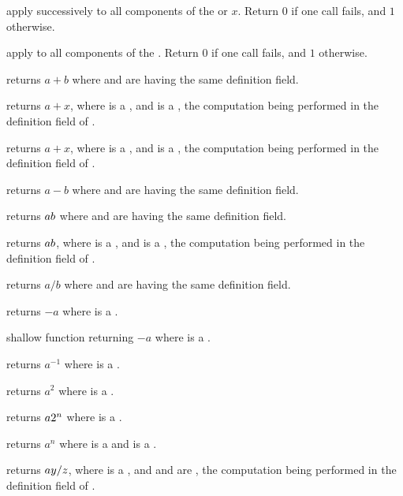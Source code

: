  apply  successively to all
components of the  or  $x$. Return $0$ if one call fails,
and $1$ otherwise.

 apply  to all components
of the . Return $0$ if one call fails, and $1$ otherwise.

 returns $a+b$ where  and  are
 having the same definition field.

 returns $a+x$, where  is a
, and  is a , the computation being
performed in the definition field of .

 returns $a+x$, where  is a
, and  is a , the computation being
performed in the definition field of .

 returns $a-b$ where  and  are
 having the same definition field.

 returns $a\*b$ where  and  are
 having the same definition field.

 returns $a\*b$, where  is a
, and  is a , the computation being
performed in the definition field of .

 returns $a/b$ where  and  are
 having the same definition field.

 returns $-a$ where  is a .

 shallow function returning $-a$ where  is a
.

 returns $a^{-1}$ where  is a .

 returns $a^2$ where  is a .

 returns $a\*2^n$ where  is a
.

 returns $a^n$ where  is a 
and is a .

 returns $a\*y/z$, where 
is a , and  and  are , the computation being
performed in the definition field of .

